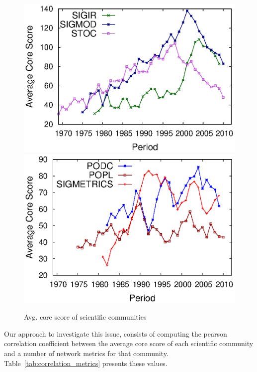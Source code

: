 \begin{figure}[!htb]
  \begin{center}
    \includegraphics[scale=.325]{graficos/average_core_score/average_core_score_slide_window_grupo_1_temporal_web.eps}
    \includegraphics[scale=.325]{graficos/average_core_score/average_core_score_slide_window_grupo_2_temporal_web.eps}
  \end{center}
  \caption{Avg. core score of scientific communities}
  \label{fig:average_core_score}
\end{figure}


Our approach to investigate this issue, consists of computing the pearson correlation coefficient between the average core score of each scientific community and a number of
network metrics for that community.  Table~\ref{tab:correlation_metrics} presents these values.

